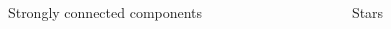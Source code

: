 \begin{minipage}[t]{\textwidth}
    \begin{columns}
        \begin{column}{0.5\textwidth}
            \begin{columns}
                \begin{column}{0.6\textwidth}
                    \begin{flushright}
                        \resizebox{0.9\textwidth}{!}{}
                    \end{flushright}
                \end{column}
                \begin{column}{0.4\textwidth}
                    Strongly connected components
                \end{column}
            \end{columns}
        \end{column}
        \hfill
        \begin{column}{0.5\textwidth}
            \begin{columns}
                \begin{column}{0.6\textwidth}
                    \begin{flushright}
                        \resizebox{0.9\textwidth}{!}{}
                    \end{flushright}
                \end{column}
                \begin{column}{0.4\textwidth}
                    Stars
                \end{column}
            \end{columns}
        \end{column}
    \end{columns}
\end{minipage}
